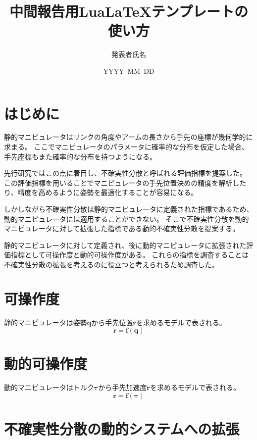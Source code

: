 \documentclass[10pt,a4j,twocolumn]{ltjsarticle}
\title{中間報告用Lua\LaTeX テンプレートの使い方} %
\author{発表者氏名}                              %
\date{YYYY--MM--DD}                              %
\begin{document}
\maketitle

\section{はじめに}

静的マニピュレータはリンクの角度やアームの長さから手先の座標が幾何学的に求まる。
ここでマニピュレータのパラメータに確率的な分布を仮定した場合、手先座標もまた確率的な分布を持つようになる。

先行研究ではこの点に着目し、不確実性分散と呼ばれる評価指標を提案した。
この評価指標を用いることでマニピュレータの手先位置決めの精度を解析したり、精度を高めるように姿勢を最適化することが容易になる。

しかしながら不確実性分散は静的マニピュレータに定義された指標であるため、動的マニピュレータには適用することができない。
そこで不確実性分散を動的マニピュレータに対して拡張した指標である動的不確実性分散を提案する。

静的マニピュレータに対して定義され、後に動的マニピュレータに拡張された評価指標として可操作度と動的可操作度がある。
これらの指標を調査することは不確実性分散の拡張を考えるのに役立つと考えられるため調査した。

\section{可操作度}

静的マニピュレータは姿勢$\bm{q}$から手先位置$\bm{r}$を求めるモデルで表される。
\begin{equation}
  \bm{r} = \bm{f}(\bm{q})
\end{equation}

\section{動的可操作度}

動的マニピュレータはトルク$\bm{\tau}$から手先加速度$\ddot{\bm{r}}$を求めるモデルで表される。
\begin{equation}
  \ddot{\bm{r}} = \bm{f}(\bm{\tau})
\end{equation}

\section{不確実性分散の動的システムへの拡張}
\end{document}
